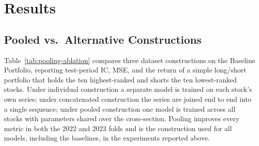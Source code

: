 \section{Results}
\label{sec:results}

\subsection{Pooled vs.\ Alternative Constructions}

Table~\ref{tab:pooling-ablation} compares three dataset constructions on the Baseline Portfolio, reporting test-period IC, MSE, and the return of a simple long/short portfolio that holds the ten highest-ranked and shorts the ten lowest-ranked stocks. Under individual construction a separate model is trained on each stock's own series; under concatenated construction the series are joined end to end into a single sequence; under pooled construction one model is trained across all stocks with parameters shared over the cross-section. Pooling improves every metric in both the 2022 and 2023 folds and is the construction used for all models, including the baselines, in the experiments reported above.

